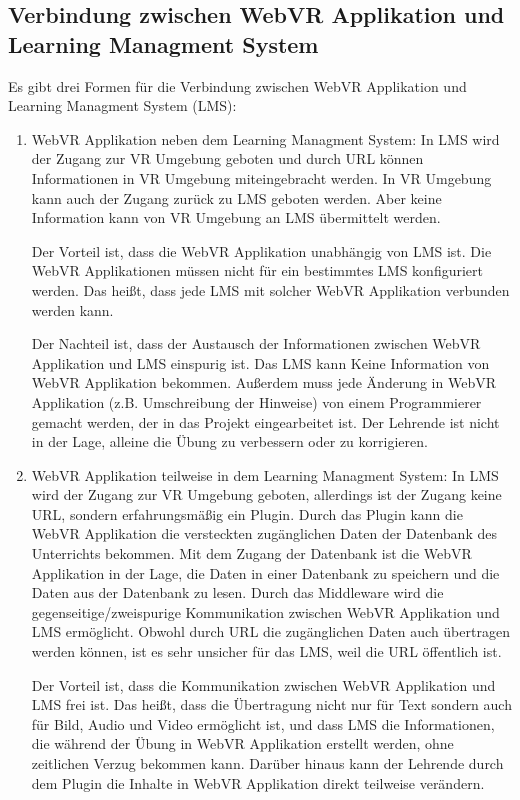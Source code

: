  \subsection{Verbindung zwischen WebVR Applikation und Learning Managment System}
 Es gibt drei Formen für die Verbindung zwischen WebVR Applikation und Learning Managment System (LMS):
 \begin{enumerate}
   \item WebVR Applikation neben dem Learning Managment System:
     \subitem In LMS wird der Zugang zur VR Umgebung geboten und durch URL können Informationen in VR Umgebung miteingebracht werden. In VR Umgebung kann auch der Zugang zurück zu LMS geboten werden. Aber keine Information kann von VR Umgebung an LMS übermittelt werden.
     
     Der Vorteil ist, dass die WebVR Applikation unabhängig von LMS ist. Die WebVR Applikationen müssen nicht für ein bestimmtes LMS konfiguriert werden. Das heißt, dass jede LMS mit solcher WebVR Applikation verbunden werden kann.
     
     Der Nachteil ist, dass der Austausch der Informationen zwischen WebVR Applikation und LMS einspurig ist. Das LMS kann Keine Information von WebVR Applikation bekommen. Außerdem muss jede Änderung in WebVR Applikation (z.B. Umschreibung der Hinweise) von einem Programmierer gemacht werden, der in das Projekt eingearbeitet ist. Der Lehrende ist nicht in der Lage, alleine die Übung zu verbessern oder zu korrigieren.
     
   \item WebVR Applikation teilweise in dem Learning Managment System:
     \subitem In LMS wird der Zugang zur VR Umgebung geboten, allerdings ist der Zugang keine URL, sondern erfahrungsmäßig ein Plugin. Durch das Plugin kann die WebVR Applikation die versteckten zugänglichen Daten der Datenbank des Unterrichts bekommen. Mit dem Zugang der Datenbank ist die WebVR Applikation in der Lage, die Daten in einer Datenbank zu speichern und die Daten aus der Datenbank zu lesen. Durch das Middleware wird die gegenseitige/zweispurige Kommunikation zwischen WebVR Applikation und LMS ermöglicht. Obwohl durch URL die zugänglichen Daten auch übertragen werden können, ist es sehr unsicher für das LMS, weil die URL öffentlich ist.
     
     Der Vorteil ist, dass die Kommunikation zwischen WebVR Applikation und LMS frei ist. Das heißt, dass die Übertragung nicht nur für Text sondern auch für Bild, Audio und Video ermöglicht ist, und dass LMS die Informationen, die während der Übung in WebVR Applikation erstellt werden, ohne zeitlichen Verzug bekommen kann. Darüber hinaus kann der Lehrende durch dem Plugin die Inhalte in WebVR Applikation direkt teilweise verändern.
     

\end{enumerate}
